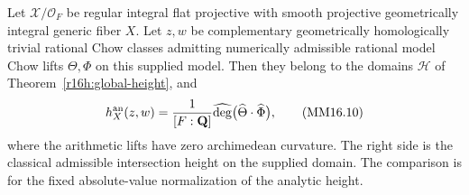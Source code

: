 \begin{theorem}
\label{r16mm:global}
Let $\mathcal X/\mathcal O_F$ be regular integral flat projective
with smooth projective geometrically integral generic fiber $X$.
Let $z,w$ be complementary geometrically homologically trivial
rational Chow classes admitting numerically admissible rational
model Chow lifts $\Theta,\Phi$ on this supplied model. Then
they belong to the domains $\mathcal H$ of
Theorem~\ref{r16h:global-height}, and
\[
 h_X^{\rm an}(z,w)=\frac1{[F:\mathbf Q]}
                \widehat{\deg}\bigl(\widehat\Theta\cdot\widehat\Phi\bigr),
 \tag{MM16.10}\label{r16mm:global-eq}
\]
where the arithmetic lifts have zero archimedean curvature.
The right side is the classical admissible intersection height
on the supplied domain. The comparison is for the fixed
absolute-value normalization of the analytic height.
\end{theorem}


